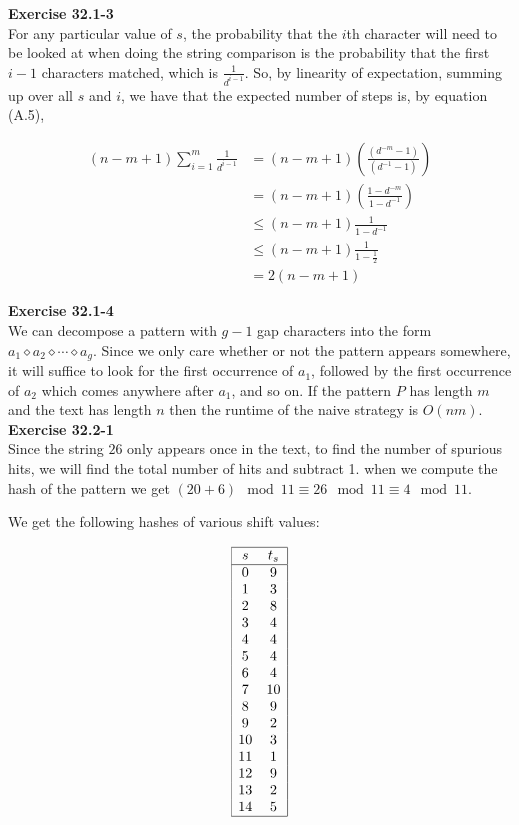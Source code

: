 \documentclass{article}
\begin{document}
\noindent\textbf{Exercise 32.1-3}\\

For any particular value of $s$, the probability that the $i$th character will need to be looked at when doing the string comparison is the probability that the first $i-1$ characters matched, which is $\frac{1}{d^{i-1}}$. So, by linearity of expectation, summing up over all $s$ and $i$, we have that the expected number of steps is, by equation (A.5),

\begin{align*}
(n-m+1) \sum_{i=1}^{m} \frac{1}{d^{i-1}}&=  (n-m+1)\left(\frac{(d^{-m}-1)}{(d^{-1}-1)}\right)\\
&= (n-m+1)(\frac{1-d^{-m}}{1-d^{-1}}) \\
&\le (n-m+1) \frac{1}{1-d^{-1}}\\
&\le (n-m+1) \frac{1}{1-\frac{1}{2}}\\
& = 2(n-m+1)
\end{align*}


\noindent\textbf{Exercise 32.1-4}\\

We can decompose a pattern with $g-1$ gap characters into the form $a_1 \diamond a_2 \diamond \cdots \diamond a_g$.  Since we only care whether or not the pattern appears somewhere, it will suffice to look for the first occurrence of $a_1$, followed by the first occurrence of $a_2$ which comes anywhere after $a_1$, and so on.  If the pattern $P$ has length $m$ and the text has length $n$ then the runtime of the naive strategy is $O(nm)$.\\

\noindent\textbf{Exercise 32.2-1}\\

Since the string $26$ only appears once in the text, to find the number of spurious hits, we will find the total number of hits and subtract 1. when we compute the hash of the pattern we get $(20 + 6)\mod 11 \equiv 26\mod 11 \equiv 4\mod 11$.

We get the following hashes of various shift values:

\[
\begin{array}{|cc|}
\hline 
s&t_s\\
\hline
0&9\\
1&3\\
2&8\\
3&4\\
4&4\\
5&4\\
6&4\\
7&10\\
8&9\\
9&2\\
10&3\\
11&1\\
12&9\\
13&2\\
14&5\\
\hline
\end{array}
\]
\end{document}
